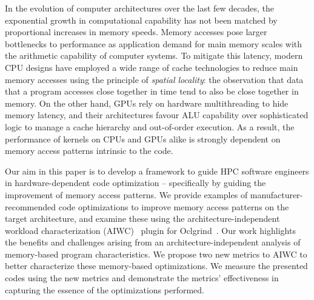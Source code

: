 \documentclass[review=false, sigchi]{acmart}
\begin{document}
	In the evolution of computer architectures over the last few decades, the exponential growth in computational capability has not been matched by proportional increases in memory speeds\cite{hennessycomparch}.
	Memory accesses pose larger bottlenecks to performance as application demand for main memory scales with the arithmetic capability of computer systems.
	To mitigate this latency, modern CPU designs have employed a wide range of cache technologies to reduce main memory accesses using the principle of \emph{spatial locality}: the observation that data that a program accesses close together in time tend to also be close together in memory.
	On the other hand, GPUs rely on hardware multithreading to hide memory latency, and their architectures favour ALU capability over sophisticated logic to manage a cache hierarchy and out-of-order execution. As a result, the performance of kernels on CPUs and GPUs alike is strongly dependent on memory access patterns intrinsic to the code. %
	
	
	
	Our aim in this paper is to develop a framework to guide HPC software engineers in hardware-dependent code optimization -- specifically by guiding the improvement of memory access patterns.
	We provide examples of manufacturer-recommended code optimizations to improve memory access patterns on the target architecture, and examine these using the architecture-independent workload characterization (AIWC)~\cite{beauaiwc} plugin for Oclgrind~\cite{price:15}.
	Our work highlights the benefits and challenges arising from an architecture-independent analysis of memory-based program characteristics.
	We propose two new metrics to AIWC to better characterize these memory-based optimizations.
	We measure the presented codes using the new metrics and demonstrate the metrics' effectiveness in capturing the essence of the optimizations performed.
	
\end{document}
